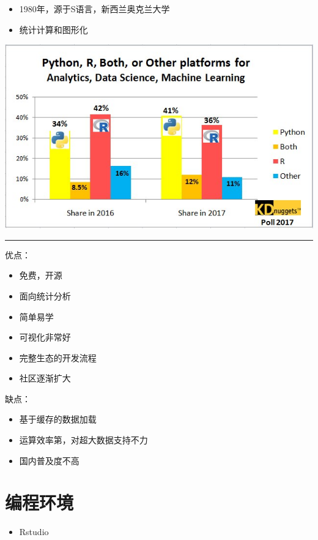 \documentclass[]{book}
\providecommand{\tightlist}{%
  \setlength{\itemsep}{0pt}\setlength{\parskip}{0pt}}
\begin{document}
\begin{itemize}
\tightlist
\item
  1980年，源于S语言，新西兰奥克兰大学
\item
  统计计算和图形化
\end{itemize}

\includegraphics{figures/poll.jpg}

\begin{center}\rule{0.5\linewidth}{\linethickness}\end{center}

优点：

\begin{itemize}
\tightlist
\item
  免费，开源
\item
  面向统计分析
\item
  简单易学
\item
  可视化非常好
\item
  完整生态的开发流程
\item
  社区逐渐扩大
\end{itemize}

缺点：

\begin{itemize}
\tightlist
\item
  基于缓存的数据加载
\item
  运算效率第，对超大数据支持不力
\item
  国内普及度不高
\end{itemize}

\hypertarget{section-2}{%
\section{编程环境}\label{section-2}}

\begin{itemize}
\tightlist
\item
  Rstudio
\end{itemize}
\end{document}
